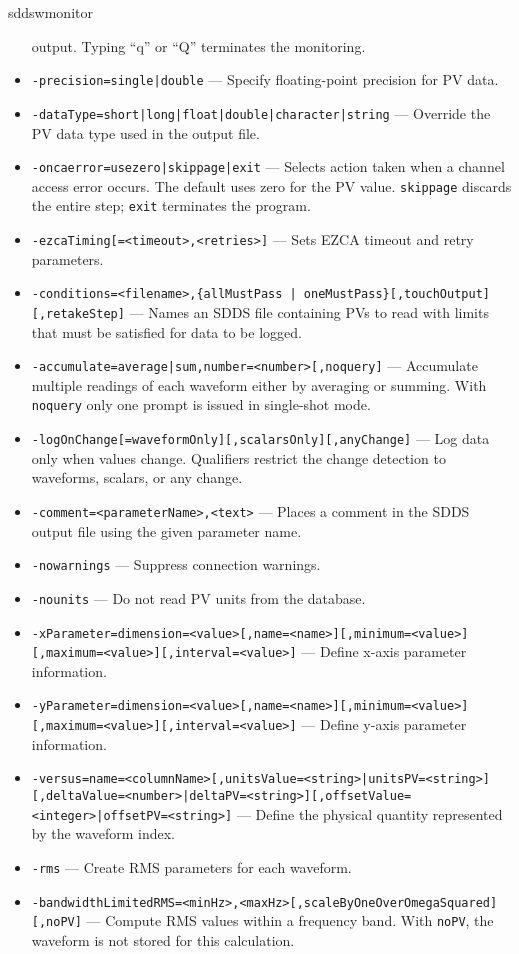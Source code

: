 \begin{sddsprog}{sddswmonitor}
\begin{itemize}
          output. Typing ``q'' or ``Q'' terminates the monitoring.
  \item {\tt -precision={single|double}} --- Specify floating-point
          precision for PV data.
  \item {\tt -dataType={short|long|float|double|character|string}} ---
          Override the PV data type used in the output file.
  \item {\tt -oncaerror={usezero|skippage|exit}} --- Selects action taken
          when a channel access error occurs. The default uses zero for the PV
          value. \verb+skippage+ discards the entire step; \verb+exit+ terminates
          the program.
  \item {\tt -ezcaTiming[=<timeout>,<retries>]} --- Sets EZCA timeout and
          retry parameters.
  \item {\verb+-conditions=<filename>,{allMustPass | oneMustPass}[,touchOutput][,retakeStep]+} ---
          Names an SDDS file containing PVs to read with limits that must be
          satisfied for data to be logged.
  \item {\tt -accumulate={average|sum},number=<number>[,noquery]} ---
          Accumulate multiple readings of each waveform either by averaging or
          summing. With \verb+noquery+ only one prompt is issued in single-shot
          mode.
  \item {\tt -logOnChange[=waveformOnly][,scalarsOnly][,anyChange]} --- Log
          data only when values change. Qualifiers restrict the change detection
          to waveforms, scalars, or any change.
  \item {\verb+-comment=<parameterName>,<text>+} --- Places a comment in the
          SDDS output file using the given parameter name.
  \item {\tt -nowarnings} --- Suppress connection warnings.
  \item {\tt -nounits} --- Do not read PV units from the database.
  \item {\tt -xParameter=dimension=<value>[,name=<name>][,minimum=<value>][,maximum=<value>][,interval=<value>]} ---
          Define x-axis parameter information.
  \item {\tt -yParameter=dimension=<value>[,name=<name>][,minimum=<value>][,maximum=<value>][,interval=<value>]} ---
          Define y-axis parameter information.
  \item {\tt -versus=name=<columnName>[,unitsValue=<string>|unitsPV=<string>][,deltaValue=<number>|deltaPV=<string>][,offsetValue=<integer>|offsetPV=<string>]} ---
          Define the physical quantity represented by the waveform index.
  \item {\tt -rms} --- Create RMS parameters for each waveform.
  \item {\tt -bandwidthLimitedRMS=<minHz>,<maxHz>[,scaleByOneOverOmegaSquared][,noPV]} ---
          Compute RMS values within a frequency band. With \verb+noPV+, the
          waveform is not stored for this calculation.
\end{itemize}


\end{sddsprog}
